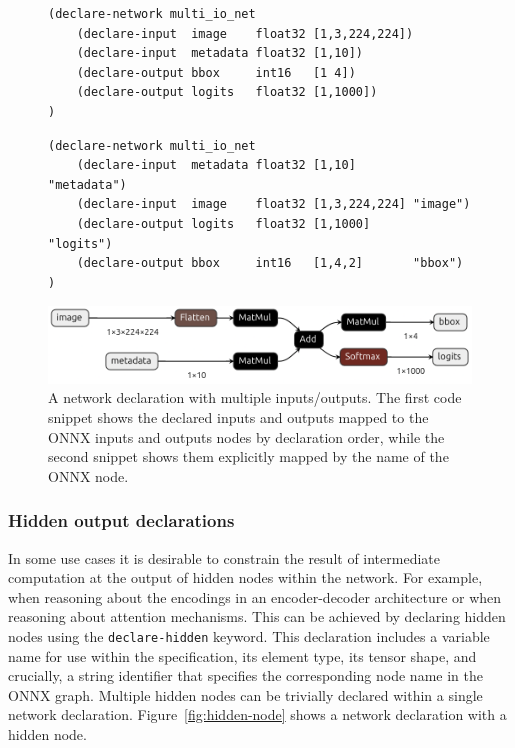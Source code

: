 \begin{figure}[h!]
    \centering
    \begin{lstlisting}[style=lbnf]
(declare-network multi_io_net
    (declare-input  image    float32 [1,3,224,224])
    (declare-input  metadata float32 [1,10])
    (declare-output bbox     int16   [1 4])
    (declare-output logits   float32 [1,1000])
)\end{lstlisting}

    \begin{lstlisting}[style=lbnf]
(declare-network multi_io_net
    (declare-input  metadata float32 [1,10]        "metadata")
    (declare-input  image    float32 [1,3,224,224] "image")
    (declare-output logits   float32 [1,1000]      "logits")
    (declare-output bbox     int16   [1,4,2]       "bbox")
)\end{lstlisting}

    \vspace{0.5cm}
    \includegraphics[width=\textwidth]{imgs/multi_io_net.onnx.png}
    \caption{A \vnnlib{} network declaration with multiple inputs/outputs. The first code snippet shows the declared inputs and outputs mapped to the ONNX inputs and outputs nodes by declaration order, while the second snippet shows them explicitly mapped by the name of the ONNX node.}
    \label{fig:multi-inputs-outputs}
\end{figure}


\subsubsection{Hidden output declarations}
\label{sec:hidden-output-declarations}

In some use cases it is desirable to constrain the result of intermediate computation at the output of hidden nodes within the network. For example, when reasoning about the encodings in an encoder-decoder architecture or when reasoning about attention mechanisms. This can be achieved by declaring hidden nodes using the \texttt{declare-hidden} keyword. This declaration includes a variable name for use within the \vnnlib{} specification,  its element type, its tensor shape, and crucially, a string identifier that specifies the corresponding node name in the ONNX graph.  Multiple hidden nodes can be trivially declared within a single network declaration. Figure~\ref{fig:hidden-node} shows a \vnnlib{} network declaration with a hidden node.

